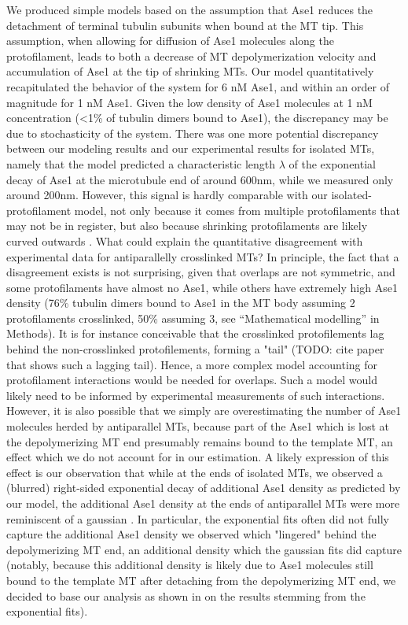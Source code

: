 We produced simple models based on the assumption that Ase1 reduces the detachment of terminal tubulin subunits when bound at the MT tip. This assumption, when allowing for diffusion of Ase1 molecules along the protofilament, leads to both a decrease of MT depolymerization velocity and accumulation of Ase1 at the tip of shrinking MTs. Our model quantitatively recapitulated the behavior of the system for 6 nM Ase1, and within an order of magnitude for 1 nM Ase1. Given the low density of Ase1 molecules at 1 nM concentration (<1\% of tubulin dimers bound to Ase1), the discrepancy may be due to stochasticity of the system. There was one more potential discrepancy between our modeling results and our experimental results for isolated MTs, namely that the model predicted a characteristic length $\lambda$ of the exponential decay of Ase1 at the microtubule end of around 600nm, while we measured only around 200nm. However, this signal is hardly comparable with our isolated-protofilament model, not only because it comes from multiple protofilaments that may not be in register, but also because shrinking protofilaments are likely curved outwards \parencite{McIntosh2008}. What could explain the quantitative disagreement with experimental data for antiparallelly crosslinked MTs? In principle, the fact that a disagreement exists is not surprising, given that overlaps are not symmetric, and some protofilaments have almost no Ase1, while others have extremely high Ase1 density (76\% tubulin dimers bound to Ase1 in the MT body assuming 2 protofilaments crosslinked, 50\% assuming 3, see “Mathematical modelling” in Methods). It is for instance conceivable that the crosslinked protofilements lag behind the non-crosslinked protofilements, forming a "tail" (TODO: cite paper that shows such a lagging tail). Hence, a more complex model accounting for protofilament interactions would be needed for overlaps. Such a model would likely need to be informed by experimental measurements of such interactions. However, it is also possible that we simply are overestimating the number of Ase1 molecules herded by antiparallel MTs, because part of the Ase1 which is lost at the depolymerizing MT end presumably remains bound to the template MT, an effect which we do not account for in our estimation. A likely expression of this effect is our observation that while at the ends of isolated MTs, we observed a (blurred) right-sided exponential decay of additional Ase1 density as predicted by our model, the additional Ase1 density at the ends of antiparallel MTs were more reminiscent of a gaussian . In particular, the exponential fits often did not fully capture the additional Ase1 density we observed which "lingered" behind the depolymerizing MT end, an additional density which the gaussian fits did capture (notably, because this additional density is likely due to Ase1 molecules still bound to the template MT after detaching from the depolymerizing MT end, we decided to base our analysis as shown in  on the results stemming from the exponential fits).
